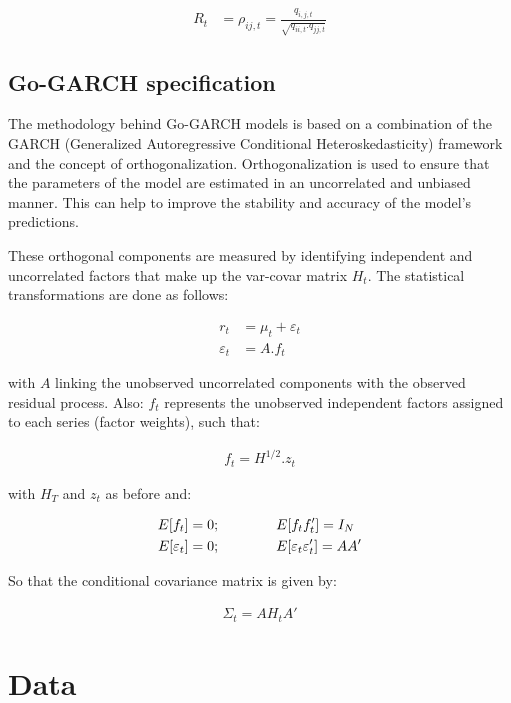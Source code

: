 \documentclass[11pt,preprint, authoryear]{elsarticle}
\numberwithin{equation}{section}
\numberwithin{figure}{section}
\numberwithin{table}{section}
\begin{document}
\begin{align}
R_t &= \rho_{ij,t} = \frac{q_{i,j,t}}{\sqrt{q_{ii,t}.q_{jj,t}}} 
\end{align}

\hypertarget{go-garch-specification}{%
\subsection{Go-GARCH specification}\label{go-garch-specification}}

The methodology behind Go-GARCH models is based on a combination of the
GARCH (Generalized Autoregressive Conditional Heteroskedasticity)
framework and the concept of orthogonalization. Orthogonalization is
used to ensure that the parameters of the model are estimated in an
uncorrelated and unbiased manner. This can help to improve the stability
and accuracy of the model's predictions.

These orthogonal components are measured by identifying independent and
uncorrelated factors that make up the var-covar matrix \(H_t\). The
statistical transformations are done as follows:

\begin{align}
r_t &= \mu_t +\varepsilon_t  \\
\varepsilon_t &= A.f_t 
\end{align}

with \(A\) linking the unobserved uncorrelated components with the
observed residual process. Also: \(f_t\) represents the unobserved
independent factors assigned to each series (factor weights), such that:

\begin{align}
    f_t = H^{1/2}.z_t
\end{align}

with \(H_T\) and \(z_t\) as before and:

\begin{align}
E[f_t] &= 0 ; \qquad \qquad E[f_tf_t'] = I_N \notag \\
E[\varepsilon_t] &= 0 ; \qquad \qquad E[\varepsilon_t\varepsilon_t'] = AA'
\end{align}

So that the conditional covariance matrix is given by:

\begin{align}
    \Sigma_t=AH_tA'
\end{align}

\hypertarget{data}{%
\section{Data}\label{data}}
\end{document}

